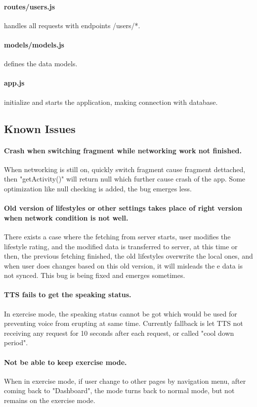 \documentclass[10pt,a4paper,final]{scrartcl}
\begin{document}
\paragraph{routes/users.js} handles all requests with endpoints /users/*.
\paragraph{models/models.js} defines the data models.
\paragraph{app.js} initialize and starts the application, making connection with database.

\subsection{Known Issues}

\paragraph{Crash when switching fragment while networking work not finished.} 
When networking is still on, quickly switch fragment cause fragment dettached, then "getActivity()" will return null which further cause crash of the app. Some optimization like null checking is added, the bug emerges less. 
\paragraph{Old version of lifestyles or other settings takes place of right version when network condition is not well.}
There exists a case where the fetching from server starts, user modifies the lifestyle rating, and the modified data is transferred to server, at this time or then, the previous fetching finished, the old lifestyles overwrite the local ones, and when user does changes based on this old version, it will misleads the e data is not synced. This bug is being fixed and emerges sometimes. 
\paragraph{TTS fails to get the speaking status.}
In exercise mode, the speaking status cannot be got which would be used for preventing voice from erupting at same time. Currently fallback is let TTS not receiving any request for 10 seconds after each request, or called "cool down period". 
\paragraph{Not be able to keep exercise mode.}
When in exercise mode, if user change to other pages by navigation menu, after coming back to "Dashboard", the mode turns back to normal mode, but not remains on the exercise mode. 
\end{document}
